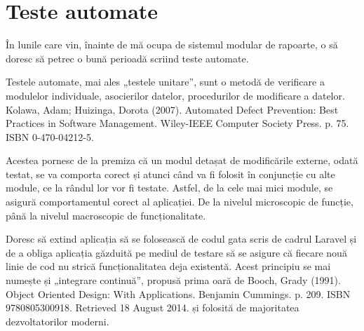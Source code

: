 \section{Teste automate}
	În lunile care vin, înainte de mă ocupa de sistemul modular de rapoarte, o să doresc să petrec o bună perioadă scriind teste automate.

	Testele automate, mai ales „testele unitare”, sunt o metodă de verificare a modulelor individuale, asocierilor datelor, procedurilor de modificare a datelor.  Kolawa, Adam; Huizinga, Dorota (2007). Automated Defect Prevention: Best Practices in Software Management. Wiley-IEEE Computer Society Press. p. 75. ISBN 0-470-04212-5.

	Acestea pornesc de la premiza că un modul detașat de modificările externe, odată testat, se va comporta corect și atunci când va fi folosit în conjuncție cu alte module, ce la rândul lor vor fi testate. Astfel, de la cele mai mici module, se asigură comportamentul corect al aplicației. De la nivelul microscopic de funcție, până la nivelul macroscopic de funcționalitate. 

	Doresc să extind aplicația să se folosească de codul gata scris de cadrul Laravel și de a obliga aplicația găzduită pe mediul de testare să se asigure că fiecare nouă linie de cod nu strică funcționalitatea deja existentă. Acest principiu se mai numește și „integrare continuă”, propusă prima oară de Booch, Grady (1991). Object Oriented Design: With Applications. Benjamin Cummings. p. 209. ISBN 9780805300918. Retrieved 18 August 2014.
	și folosită de majoritatea dezvoltatorilor moderni.